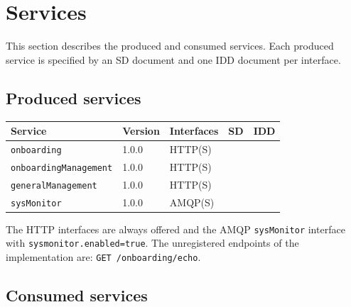 \documentclass[a4paper]{arrowhead}
\begin{document}
\newpage

\section{Services}
\label{sec:services}

This section describes the produced and consumed services. Each produced service is specified by an SD document and one IDD document per interface.

\subsection{Produced services}

\noindent\begin{longtable}{| p{5.3cm} | p{1.3cm} | p{2.6cm} | p{1.6cm} | p{3.6cm} |} \hline
\rowcolor{gray!33} Service & Version & Interfaces & SD & IDD \\ \hline \endhead
\texttt{onboarding} & 1.0.0 & HTTP(S) & \cite{onb-onboarding-sd} & \cite{onb-onboarding-http-idd} \\ \hline
\texttt{onboarding\allowbreak{}Management} & 1.0.0 & HTTP(S) & \cite{onb-onboardingManagement-sd} & \cite{onb-onboardingManagement-http-idd} \\ \hline
\texttt{generalManagement} & 1.0.0 & HTTP(S) & \cite{onb-generalManagement-sd} & \cite{onb-generalManagement-http-idd} \\ \hline
\texttt{sysMonitor} & 1.0.0 & AMQP(S) & \cite{onb-sysMonitor-sd} & \cite{onb-sysMonitor-amqp-idd} \\ \hline
\end{longtable}

The HTTP interfaces are always offered and the AMQP \texttt{sysMonitor} interface with \texttt{sysmonitor.enabled=true}. The unregistered endpoints of the implementation are: \texttt{GET /\allowbreak{}onboarding/\allowbreak{}echo}.

\subsection{Consumed services}
\end{document}
